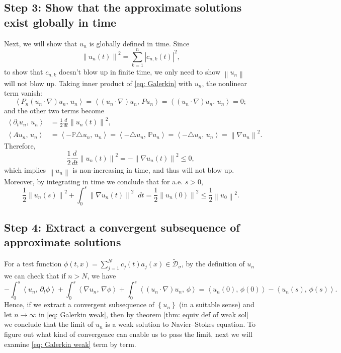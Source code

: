 \documentclass[a4paper, 12pt, oneside]{amsart}
\theoremstyle{definition}
\theoremstyle{remark}
\newcommand{\abs}[1]{\left\lvert #1 \right\rvert}
\newcommand{\norm}[1]{\left\lVert #1 \right\rVert}
\newcommand{\bk}[2]{\left\langle #1,\, #2 \right\rangle}
\newcommand{\set}[1]{\left\{ #1 \right\}}
\newcommand{\dt}{\mathop{}\!dt}
\newcommand{\dd}[2]{\frac{d{#1}}{d{#2}}}
\renewcommand{\leq}{\leqslant}
\newcommand{\f}[2]{\frac{#1}{#2}}
\newcommand{\p}{\partial}
\newcommand{\mc}[1]{\mathcal{#1}}
\newcommand{\mb}[1]{\mathbb{#1}}
\newcommand{\laplace}{\triangle}
\begin{document}
\subsection*{Step 3: Show that the approximate solutions exist globally in time}

Next, we will show that $u_n$ is globally defined in time. Since
\[
    \norm{u_n(t)}^2 = \sum_{k=1}^n \abs{c_{n, k}(t)}^2,
\]
to show that $c_{n, k}$ doesn't blow up in finite time, we only need to show $\norm{u_n}$ will not blow up. Taking inner product of \eqref{eq: Galerkin} with $u_n$, the nonlinear term vanish:
\[
    \bk{P_n(u_n\cdot\nabla)u_n}{u_n} = \bk{(u_n\cdot\nabla)u_n}{Pu_n} = \bk{(u_n\cdot\nabla)u_n}{u_n} = 0;
\]
and the other two terms become
\begin{align*}
    \bk{\p_tu_n}{u_n} &= \f{1}{2}\dd{}{t}\norm{u_n(t)}^2,\\
    \bk{Au_n}{u_n} &= \bk{-\mb{P}\laplace u_n}{u_n} = \bk{-\laplace u_n}{\mb{P}u_n} = \bk{-\laplace u_n}{u_n} = \norm{\nabla u_n}^2.
\end{align*}
Therefore, 
\begin{equation*}
    \f{1}{2}\dd{}{t}\norm{u_n(t)}^2 = -\norm{\nabla u_n(t)}^2 \leq 0,
\end{equation*}
which implies $\norm{u_n}$ is non-increasing in time, and thus will not blow up. Moreover, by integrating in time we conclude that for a.e. $s>0$,
\begin{equation}
    \label{eq: Galerkin, E-esitimate}
    \f{1}{2}\norm{u_n(s)}^2 + \int_0^s\norm{\nabla u_n(t)}^2\dt = \f{1}{2}\norm{u_n(0)}^2\leq\f{1}{2}\norm{u_0}^2.
\end{equation}

\subsection*{Step 4: Extract a convergent subsequence of approximate solutions}

For a test function $\phi(t, x)=\sum_{j=1}^{N}c_j(t)a_j(x)\in\tilde{\mc{D}}_\sigma$, by the definition of $u_n$ we can check that if $n>N$, we have
\begin{equation}
    \label{eq: Galerkin weak}
    -\int_0^s\bk{u_n}{\p_t\phi} + \int_0^s\bk{\nabla u_n}{\nabla\phi} + \int_0^s \bk{(u_n\cdot\nabla)u_n}{\phi} = \bk{u_n(0)}{\phi(0)} - \bk{u_n(s)}{\phi(s)}.
\end{equation}
Hence, if we extract a convergent subsequence of $\set{u_n}$ (in a suitable sense) and let $n\to\infty$ in \eqref{eq: Galerkin weak}, then by theorem \ref{thm: equiv def of weak sol} we conclude that the limit of $u_n$ is a weak solution to Navier--Stokes equation. To figure out what kind of convergence can enable us to pass the limit, next we will examine \eqref{eq: Galerkin weak} term by term.
\end{document}
